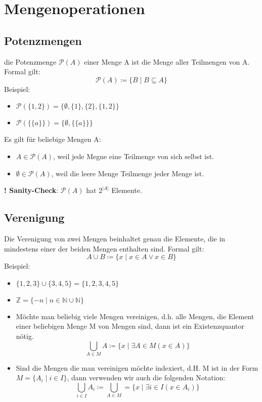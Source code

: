 \section{Mengenoperationen}
\subsection{Potenzmengen}
die Potenzmenge $\mathcal{P}(A)$ einer Menge A ist die Menge aller Teilmengen von A. Formal gilt:
\begin{equation}
\mathcal{P}(A) \coloneqq \{B \mid B \subseteq A\}
\end{equation}
Beispiel: 
\begin{itemize}
    \item $\mathcal{P}(\{1,2\}) = \{\emptyset, \{1\}, \{2\}, \{1,2\}\}$
    \item $\mathcal{P}(\{\{a\}\}) = \{\emptyset, \{\{a\}\}\}$
\end{itemize}

Es gilt für beliebige Mengen A:
\begin{itemize}
    \item $A \in \mathcal{P}(A)$, weil jede Megne eine Teilmenge von sich selbst ist.
    \item $\emptyset \in \mathcal{P}(A)$, weil die leere Menge Teilmenge jeder Menge ist.
\end{itemize}
{\bf! Sanity-Check}: $\mathcal{P}(A)$ hat $2^{|A|}$ Elemente.
\subsection{Verenigung}
Die Verenigung von zwei Mengen beinhaltet genau die Elemente, die in mindestens einer der beiden Mengen enthalten sind. Formal gilt:
\begin{equation}
A \cup B \coloneqq \{x \mid x \in A \vee x \in B\}
\end{equation}
Beispiel:
\begin{itemize}
    \item $\{1,2,3\} \cup \{3,4,5\} = \{1,2,3,4,5\}$
    \item $\mathbb{Z} = \{-n \mid n \in \mathbb{N} \cup \mathbb{N}\}$
\end{itemize}
\begin{itemize}
    \item Möchte man beliebig viele Mengen vereinigen, d.h. alle
    Mengen, die Element einer beliebigen Menge M von Mengen
    sind, dann ist ein Existenzquantor nötig.
    \begin{equation}
        \bigcup_{A \in M} A \coloneqq \{x \mid \exists{A} \in M(x \in A)\}
    \end{equation}
    \item Sind die Mengen die man vereinigen möchte indexiert, d.H. M ist in der Form $M = \{A_i \mid i \in I\}$,
    dann verwenden wir auch die folgenden Notation:
    \begin{equation}
        \bigcup_{i \in I} A_i \coloneqq \bigcup_{A \in M} = \{x \mid \exists{i} \in I(x \in A_i)\}
    \end{equation}
\end{itemize}

